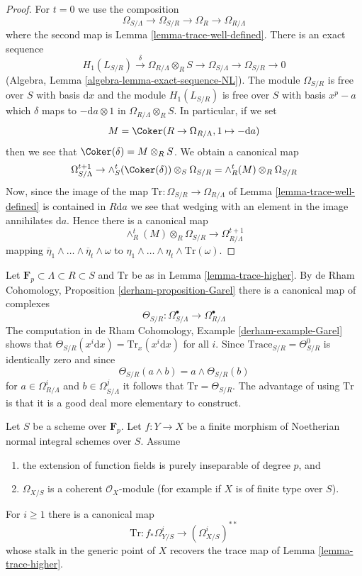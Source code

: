 \begin{proof}
For $t = 0$ we use the composition
$$
\Omega_{S/\Lambda} \to \Omega_{S/R} \to \Omega_R \to \Omega_{R/\Lambda}
$$
where the second map is Lemma \ref{lemma-trace-well-defined}.
There is an exact sequence
$$
H_1(L_{S/R}) \xrightarrow{\delta} \Omega_{R/\Lambda} \otimes_R S \to
\Omega_{S/\Lambda} \to \Omega_{S/R} \to 0
$$
(Algebra, Lemma \ref{algebra-lemma-exact-sequence-NL}).
The module $\Omega_{S/R}$ is free over $S$ with basis $\text{d}x$
and the module $H_1(L_{S/R})$ is free over $S$ with basis $x^p - a$
which $\delta$ maps to $-\text{d}a \otimes 1$ in
$\Omega_{R/\Lambda} \otimes_R S$. In particular, if we set
$$
M = \Coker(R \to \Omega_{R/\Lambda}, 1 \mapsto -\text{d}a)
$$
then we see that $\Coker(\delta) = M \otimes_R S$. We obtain a
canonical map
$$
\Omega^{t + 1}_{S/\Lambda} \to
\wedge_S^t(\Coker(\delta)) \otimes_S \Omega_{S/R} =
\wedge^t_R(M) \otimes_R \Omega_{S/R}
$$
Now, since the image of the map
$\text{Tr} : \Omega_{S/R} \to \Omega_{R/\Lambda}$
of Lemma \ref{lemma-trace-well-defined} is contained in $R\text{d}a$ we
see that wedging with an element in the image annihilates $\text{d}a$.
Hence there is a canonical map
$$
\wedge^t_R(M) \otimes_R \Omega_{S/R} \to \Omega_{R/\Lambda}^{t + 1}
$$
mapping
$\overline{\eta}_1 \wedge \ldots \wedge \overline{\eta}_t \wedge \omega$
to $\eta_1 \wedge \ldots \wedge \eta_t \wedge \text{Tr}(\omega)$.
\end{proof}

\begin{remark}
\label{remark-compare-Garel}
Let $\mathbf{F}_p \subset \Lambda \subset R \subset S$ and $\text{Tr}$
be as in Lemma \ref{lemma-trace-higher}. By
de Rham Cohomology, Proposition \ref{derham-proposition-Garel}
there is a canonical map of complexes
$$
\Theta_{S/R} :
\Omega_{S/\Lambda}^\bullet
\longrightarrow
\Omega_{R/\Lambda}^\bullet
$$
The computation in de Rham Cohomology, Example \ref{derham-example-Garel}
shows that $\Theta_{S/R}(x^i \text{d}x) = \text{Tr}_x(x^i\text{d}x)$
for all $i$. Since $\text{Trace}_{S/R} = \Theta^0_{S/R}$
is identically zero and since
$$
\Theta_{S/R}(a \wedge b) = a \wedge \Theta_{S/R}(b)
$$
for $a \in \Omega^i_{R/\Lambda}$ and $b \in \Omega^j_{S/\Lambda}$
it follows that $\text{Tr} = \Theta_{S/R}$. The advantage of using $\text{Tr}$
is that it is a good deal more elementary to construct.
\end{remark}

\begin{lemma}
\label{lemma-trace-extends}
Let $S$ be a scheme over $\mathbf{F}_p$. Let $f : Y \to X$ be a finite morphism
of Noetherian normal integral schemes over $S$. Assume
\begin{enumerate}
\item the extension of function fields is purely inseparable of degree $p$, and
\item $\Omega_{X/S}$ is a coherent $\mathcal{O}_X$-module (for example
if $X$ is of finite type over $S$).
\end{enumerate}
For $i \geq 1$ there is a canonical map
$$
\text{Tr} : f_*\Omega^i_{Y/S} \longrightarrow (\Omega_{X/S}^i)^{**}
$$
whose stalk in the generic point of $X$ recovers the trace map of
Lemma \ref{lemma-trace-higher}.
\end{lemma}

